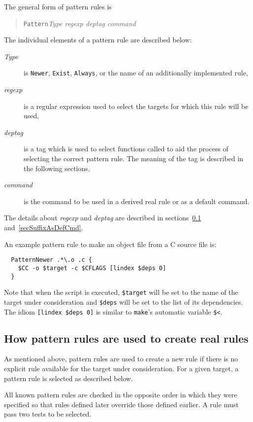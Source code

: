 \documentclass[12pt]{article}
\newcommand{\make}{\texttt{make}}
\begin{document}
The general form of pattern rules is
\begin{quote}
\texttt{Pattern}\textit{Type regexp deptag command}
\end{quote}

The individual elements of a pattern rule are described below:

\begin{description}
\item[\textit{Type}] 
  is \texttt{Newer}, \texttt{Exist},
  \texttt{Always}, or the name of an additionally
  implemented rule, 
\item[\textit{regexp}] 
  is a regular expression used to select the targets
  for which this rule will be used,
\item[\textit{deptag}]
  is a tag which is used to select functions called to aid the
  process of selecting the correct pattern rule. The meaning of the
  tag is described in the following sections.
\item[\textit{command}] 
  is the command to be used in a derived real
  rule or as a default command.
\end{description}

The details about \textit{regexp} and \textit{deptag} are described
in sections~\ref{secSuffixToReal} and~\ref{secSuffixAsDefCmd}.

An example pattern rule to make an object file from a C source file is:
\begin{verbatim}
  PatternNewer .*\.o .c {
    $CC -o $target -c $CFLAGS [lindex $deps 0]
  }
\end{verbatim}
Note that when the script is executed, \texttt{\$target}
will be set to the name of the target under consideration and
\texttt{\$deps} will be set to the list of its dependencies. The idiom
\texttt{[lindex \$deps 0]} is similar to \make's automatic variable
\texttt{\$<}. 


\subsection{How pattern rules are used to create real rules}
\label{secSuffixToReal}

As mentioned above, pattern rules are used to create a new rule if
there is no explicit rule available for the target under
consideration. 
For a given target, a pattern rule is selected as described
below.

All known pattern rules are checked in the opposite order in which
they were specified so that rules defined later override those defined earlier. A rule must pass two tests to be selected.
\end{document}
